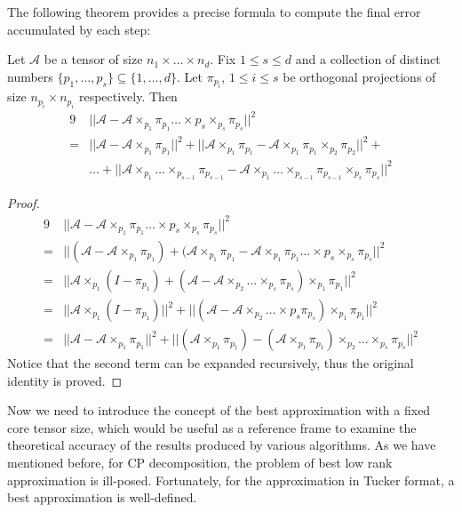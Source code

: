 \documentclass[12pt]{article}
\begin{document}
The following theorem provides a precise formula to compute the final error accumulated by each step:
\begin{mythm}
\label{tuckerm1}
Let $\mathcal{A}$ be a tensor of size $n_1 \times \dots \times n_d$. Fix $1 \leq s \leq d$ and a collection of distinct numbers $\{p_1, \dots, p_s\} \subseteq \{1, \dots, d\}$. Let $\pi_{p_i}$, $1 \leq i \leq s$ be orthogonal projections of size $n_{p_i} \times n_{p_i}$ respectively.
Then 
\begin{alignat*}{9}
& || \mathcal{A} - \mathcal{A} \times_{p_1} \pi_{p_1} \dots \times{p_s} \times_{p_s} \pi_{p_s}||^2 \\
= & || \mathcal{A} - \mathcal{A} \times_{p_1} \pi_{p_1} ||^2 + || \mathcal{A} \times_{p_1} \pi_{p_1} - \mathcal{A} \times_{p_1} \pi_{p_1} \times_{p_2} \pi_{p_2} || ^ 2 +  \\
& \dots + || \mathcal{A} \times_{p_1} \dots \times_{p_{s-1}} \pi_{p_{s-1}} - \mathcal{A} \times_{p_1} \dots \times_{p_{s-1}} \pi_{p_{s-1}} \times_{p_s} \pi_{p_s} || ^2
\end{alignat*}
\end{mythm}

\begin{proof}
\begin{alignat*}{9}
& || \mathcal{A} - \mathcal{A} \times_{p_1} \pi_{p_1} \dots \times{p_s} \times_{p_s} \pi_{p_s}||^2 \\
= & || (\mathcal{A} - \mathcal{A} \times_{p_1} \pi_{p_1}) + (\mathcal{A} \times_{p_1} \pi_{p_1} - \mathcal{A} \times_{p_1} \pi_{p_1} \dots \times{p_s} \times_{p_s} \pi_{p_s} || ^2 \\
= & || \mathcal{A} \times_{p_1} (I - \pi_{p_1}) + (\mathcal{A} - \mathcal{A} \times_{p_2} \dots \times_{p_s} \pi_{p_s}) \times_{p_1} \pi_{p_1} || ^2 \\
= & || \mathcal{A} \times_{p_1} (I - \pi_{p_1})|| ^2 + ||(\mathcal{A} - \mathcal{A} \times_{p_2} \dots \times{p_s} \pi_{p_s}) \times_{p_1} \pi_{p_1} || ^2 \\
= & || \mathcal{A} - \mathcal{A} \times_{p_1} \pi_{p_1} ||^2 + || (\mathcal{A} \times_{p_1} \pi_{p_1}) - (\mathcal{A} \times_{p_1} \pi_{p_1}) \times_{p_2} \dots \times_{p_s} \pi_{p_s} || ^ 2
\end{alignat*}
Notice that the second term can be expanded recursively, thus the original identity is proved.
\end{proof}

Now we need to introduce the concept of the best approximation with a fixed core tensor size, which would be useful as a reference frame to examine the theoretical accuracy of the results produced by various algorithms. As we have mentioned before, for CP decomposition, the problem of best low rank approximation is ill-posed. Fortunately, for the approximation in Tucker format, a best approximation is well-defined.
\end{document}
